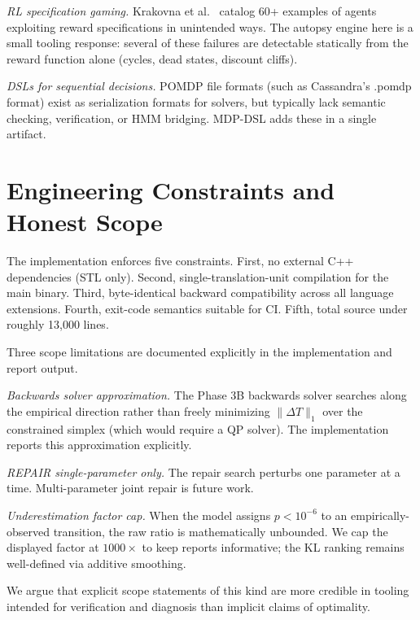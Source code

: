\documentclass[conference]{IEEEtran}
\begin{document}
\emph{RL specification gaming.} Krakovna et
al.~\cite{krakovna2020specification} catalog 60+ examples of agents
exploiting reward specifications in unintended ways. The autopsy
engine here is a small tooling response: several of these failures
are detectable statically from the reward function alone (cycles,
dead states, discount cliffs).

\emph{DSLs for sequential decisions.} POMDP file formats (such as
Cassandra's .pomdp format) exist as serialization formats for
solvers, but typically lack semantic checking, verification, or HMM
bridging. MDP-DSL adds these in a single artifact.

\section{Engineering Constraints and Honest Scope}

The implementation enforces five constraints. First, no external C++
dependencies (STL only). Second, single-translation-unit compilation
for the main binary. Third, byte-identical backward compatibility
across all language extensions. Fourth, exit-code semantics suitable
for CI. Fifth, total source under roughly 13{,}000 lines.

Three scope limitations are documented explicitly in the
implementation and report output.

\emph{Backwards solver approximation.} The Phase 3B backwards solver
searches along the empirical direction rather than freely minimizing
$\|\Delta T\|_1$ over the constrained simplex (which would require a
QP solver). The implementation reports this approximation
explicitly.

\emph{REPAIR single-parameter only.} The repair search perturbs one
parameter at a time. Multi-parameter joint repair is future work.

\emph{Underestimation factor cap.} When the model assigns
$p < 10^{-6}$ to an empirically-observed transition, the raw ratio
is mathematically unbounded. We cap the displayed factor at
$1000\times$ to keep reports informative; the KL ranking remains
well-defined via additive smoothing.

We argue that explicit scope statements of this kind are more
credible in tooling intended for verification and diagnosis than
implicit claims of optimality.

\end{document}
